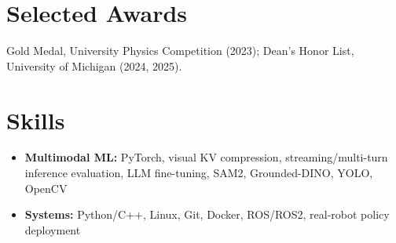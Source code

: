 \documentclass[11pt,letterpaper]{article}
\newcommand{\resumeItem}[1]{
    \item #1
}
\begin{document}
\section*{Selected Awards}
\small Gold Medal, University Physics Competition (2023); Dean's Honor List, University of Michigan (2024, 2025).
\section*{Skills}
\begin{itemize}[leftmargin=2.4em, itemsep=0.5pt, topsep=0pt]
\small
\resumeItem{\textbf{Multimodal ML:} PyTorch, visual KV compression, streaming/multi-turn inference evaluation, LLM fine-tuning, SAM2, Grounded-DINO, YOLO, OpenCV}
\resumeItem{\textbf{Systems:} Python/C++, Linux, Git, Docker, ROS/ROS2, real-robot policy deployment}
\end{itemize}
\end{document}
